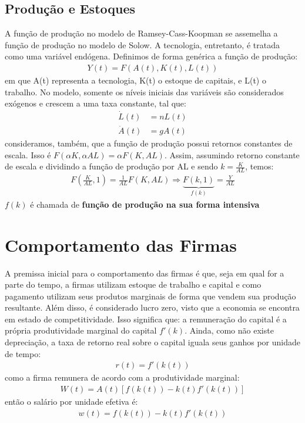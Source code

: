 \documentclass[11pt,a4paper]{article}
\begin{document}
\subsection{Produção e Estoques}

A função de produção no modelo de Ramsey-Cass-Koopman se assemelha a função de produção no modelo de Solow. A tecnologia, entretanto, é tratada como uma variável endógena. Definimos de forma genérica a função de produção:
\begin{align*}
Y(t) = F(A(t), K(t), L(t))
\end{align*}
\noindent
em que A(t) representa a tecnologia, K(t) o estoque de capitais, e L(t) o trabalho. No modelo, somente os níveis iniciais das variáveis são considerados exógenos e crescem a uma taxa constante, tal que:
\begin{align*}
\dot{L}(t) &= nL(t) \\
\dot{A}(t) &= gA(t)
\end{align*} 
\noindent
consideramos, também, que a função de produção possui retornos constantes de escala. Isso é $F(\alpha K, \alpha AL)= \alpha F(K,AL)$. Assim, assumindo retorno constante de escala e dividindo a função de produção por AL e sendo $k = \frac{K}{AL}$, temos:
\begin{align*}
F\left(\frac{K}{AL}, 1\right) = \frac{1}{AL}F(K, AL) \Rightarrow \underbrace{F(k, 1)}_{f(k)} = \frac{Y}{AL}
\end{align*}
\noindent
$f(k)$ é chamada de \textbf{função de produção na sua forma intensiva}

\section{Comportamento das Firmas}

A premissa inicial para o comportamento das firmas é que, seja em qual for a parte do tempo, a firmas utilizam estoque de trabalho e capital e como pagamento utilizam seus produtos marginais de forma que vendem sua produção resultante. Além disso, é considerado lucro zero, visto que a economia se encontra em estado de competitividade. Isso significa que: a remuneração do capital é a própria produtividade marginal do capital $f'(k)$. Ainda, como não existe depreciação, a taxa de retorno real sobre o capital iguala seus ganhos por unidade de tempo:
\begin{align}
r(t) = f'(k(t))
\end{align}
\noindent
como a firma remunera de acordo com a produtividade marginal:
\begin{align}
W(t) = A(t)[f(k(t)) - k(t)f'(k(t))]
\end{align}
\noindent
então o salário por unidade efetiva é:
\begin{align}
w(t) = f(k(t)) - k(t)f'(k(t))
\end{align}
\end{document}
